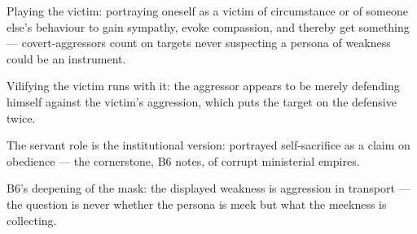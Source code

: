 

\begin{distilled}
  \item Playing the victim: portraying oneself as a victim of circumstance or of someone else's behaviour to gain sympathy, evoke compassion, and thereby get something --- covert-aggressors count on targets never suspecting a persona of weakness could be an instrument.
  \item Vilifying the victim runs with it: the aggressor appears to be merely defending himself against the victim's aggression, which puts the target on the defensive twice.
  \item The servant role is the institutional version: portrayed self-sacrifice as a claim on obedience --- the cornerstone, B6 notes, of corrupt ministerial empires.
  \item B6's deepening of the mask: the displayed weakness is aggression in transport --- the question is never whether the persona is meek but what the meekness is collecting.
\end{distilled}

